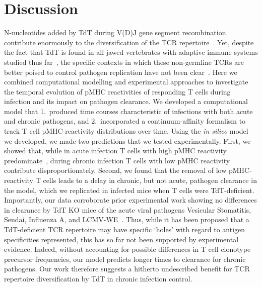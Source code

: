 \section{Discussion}
\label{sec:AvC_discussion}

N-nucleotides added by TdT during V(D)J gene segment recombination contribute enormously to the diversification of the TCR repertoire~\cite{cabaniols2001most}. Yet, despite the fact that TdT is found in all jawed vertebrates with adaptive immune systems studied thus far~\cite{litman2010origins}, the specific contexts in which these non-germline TCRs are better poised to control pathogen replication have not been clear~\cite{gilfillan1995mice,gilfillan1995efficient}. Here we combined computational modelling and experimental approaches to investigate the temporal evolution of pMHC reactivities of responding T cells during infection and its impact on pathogen clearance. We developed a computational model that 1.~produced time courses characteristic of infections with both acute and chronic pathogens, and 2.~incorporated a continuum-affinity formalism to track T cell pMHC-reactivity distributions over time.  Using the \textit{in silico} model we developed, we made two predictions that we tested experimentally. First, we showed that, while in acute infection T cells with high pMHC reactivity predominate~\cite{busch1999t,bachmann1997functional,mcheyzer1995antigen}, during chronic infection T cells with low pMHC reactivity contribute disproportionately. Second, we found that the removal of low pMHC-reactivity T cells leads to a delay in chronic, but not acute, pathogen clearance in the model, which we replicated in infected mice when T cells were TdT-deficient. Importantly, our data corroborate prior experimental work showing no differences in clearance by TdT KO mice of the acute viral pathogens Vesicular Stomatitis, Sendai, Influenza A, and LCMV-WE~\cite{gilfillan1995efficient,haeryfar2008terminal}. Thus, while it has been proposed that a TdT-deficient TCR repertoire may have specific ‘holes’ with regard to antigen specificities represented, this has so far not been supported by experimental evidence. Indeed, without accounting for possible differences in T cell clonotype precursor frequencies, our model predicts longer times to clearance for chronic pathogens. Our work therefore suggests a hitherto undescribed benefit for TCR repertoire diversification by TdT in chronic infection control.

